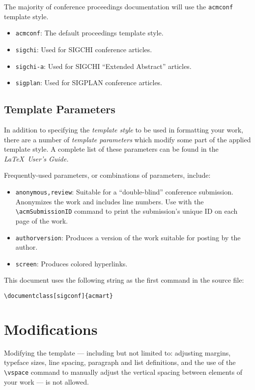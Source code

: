 \documentclass[sigconf]{acmart}
\begin{document}
The majority of conference proceedings documentation will use the {\verb|acmconf|} template style.
\begin{itemize}
\item {\verb|acmconf|}: The default proceedings template style.
\item{\verb|sigchi|}: Used for SIGCHI conference articles.
\item{\verb|sigchi-a|}: Used for SIGCHI ``Extended Abstract'' articles.
\item{\verb|sigplan|}: Used for SIGPLAN conference articles.
\end{itemize}

\subsection{Template Parameters}

In addition to specifying the {\itshape template style} to be used in
formatting your work, there are a number of {\itshape template parameters}
which modify some part of the applied template style. A complete list
of these parameters can be found in the {\itshape \LaTeX\ User's Guide.}

Frequently-used parameters, or combinations of parameters, include:
\begin{itemize}
\item {\verb|anonymous,review|}: Suitable for a ``double-blind''
  conference submission. Anonymizes the work and includes line
  numbers. Use with the \verb|\acmSubmissionID| command to print the
  submission's unique ID on each page of the work.
\item{\verb|authorversion|}: Produces a version of the work suitable
  for posting by the author.
\item{\verb|screen|}: Produces colored hyperlinks.
\end{itemize}

This document uses the following string as the first command in the
source file:
\begin{verbatim}
\documentclass[sigconf]{acmart}
\end{verbatim}

\section{Modifications}

Modifying the template --- including but not limited to: adjusting
margins, typeface sizes, line spacing, paragraph and list definitions,
and the use of the \verb|\vspace| command to manually adjust the
vertical spacing between elements of your work --- is not allowed.
\end{document}
